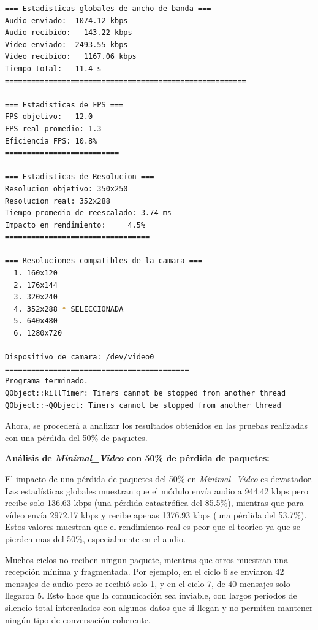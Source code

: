\begin{lstlisting}[language=bash,basicstyle=\ttfamily\scriptsize]
=== Estadisticas globales de ancho de banda ===
Audio enviado:	1074.12 kbps
Audio recibido:   143.22 kbps
Video enviado:	2493.55 kbps
Video recibido:   1167.06 kbps
Tiempo total: 	11.4 s
=======================================================

=== Estadisticas de FPS ===
FPS objetivo: 	12.0
FPS real promedio: 1.3
Eficiencia FPS:	10.8%
==========================

=== Estadisticas de Resolucion ===
Resolucion objetivo: 350x250
Resolucion real: 352x288
Tiempo promedio de reescalado: 3.74 ms
Impacto en rendimiento:    	4.5%
=================================

=== Resoluciones compatibles de la camara ===
  1. 160x120
  2. 176x144
  3. 320x240
  4. 352x288 * SELECCIONADA
  5. 640x480
  6. 1280x720

Dispositivo de camara: /dev/video0
==========================================
Programa terminado.
QObject::killTimer: Timers cannot be stopped from another thread
QObject::~QObject: Timers cannot be stopped from another thread
\end{lstlisting}

\newpage

Ahora, se procederá a analizar los resultados obtenidos en las pruebas realizadas con una pérdida del 50\% de paquetes.
\vspace{\baselineskip}

\textbf{Análisis de \textit{Minimal\_Video} con 50\% de pérdida de paquetes:}
\vspace{\baselineskip}

El impacto de una pérdida de paquetes del 50\% en \textit{Minimal\_Video} es devastador. Las estadísticas globales muestran que el módulo envía audio a 944.42 kbps pero recibe solo 136.63 kbps (una pérdida catastrófica del 85.5\%), mientras que para vídeo envía 2972.17 kbps y recibe apenas 1376.93 kbps (una pérdida del 53.7\%). Estos valores muestran que el rendimiento real es peor que el teorico ya que se pierden mas del 50\%, especialmente en el audio.
\vspace{\baselineskip}

Muchos ciclos no reciben ningun paquete, mientras que otros muestran una recepción mínima y fragmentada. Por ejemplo, en el ciclo 6 se enviaron 42 mensajes de audio pero se recibió solo 1, y en el ciclo 7, de 40 mensajes solo llegaron 5. Esto hace que la comunicación sea inviable, con largos períodos de silencio total intercalados con algunos datos que si llegan y no permiten mantener ningún tipo de conversación coherente.

